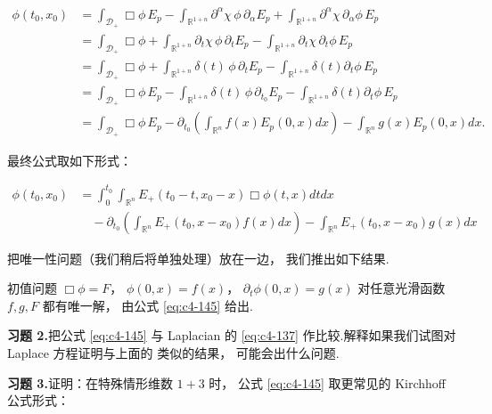 \[
\begin{aligned}
\phi(t_{0}, x_{0}) &= \int_{\mathcal{D}_{+}}\Box\phi\, E_{p} - \int_{\mathbb{R}^{1+n}}\partial^{\alpha}\chi\, \phi\, \partial_{\alpha}E_{p} + \int_{\mathbb{R}^{1+n}}\partial^{\alpha}\chi\, \partial_{\alpha}\phi\, E_{p} \\
&= \int_{\mathcal{D}_{+}}\Box\phi + \int_{\mathbb{R}^{1+n}}\partial_{t}\chi\, \phi\, \partial_{t}E_{p} - \int_{\mathbb{R}^{1+n}}\partial_{t}\chi\, \partial_{t}\phi\, E_{p} \\
&= \int_{\mathcal{D}_{+}}\Box\phi + \int_{\mathbb{R}^{1+n}}\delta(t)\, \phi\, \partial_{t}E_{p} - \int_{\mathbb{R}^{1+n}}\delta(t)\partial_{t}\phi\, E_{p} \\
&= \int_{\mathcal{D}_{+}}\Box\phi\, E_{p} - \int_{\mathbb{R}^{1+n}}\delta(t)\, \phi\, \partial_{t_{0}}E_{p} - \int_{\mathbb{R}^{1+n}}\delta(t)\partial_{t}\phi\, E_{p} \\
&= \int_{\mathcal{D}_{+}}\Box\phi\, E_{p} - \partial_{t_{0}}\left(\int_{\mathbb{R}^{n}}f(x)E_{p}(0, x)dx\right) - \int_{\mathbb{R}^{n}}g(x)E_{p}(0, x)dx.
\end{aligned}
\]

最终公式取如下形式：

\begin{equation}
\begin{aligned}
\phi(t_{0}, x_{0}) &= \int_{0}^{t_{0}}\int_{\mathbb{R}^{n}}E_{+}(t_{0}-t, x_{0}-x)\Box\phi(t, x)dtdx \\
&\quad - \partial_{t_{0}}\left(\int_{\mathbb{R}^{n}}E_{+}(t_{0}, x-x_{0})f(x)dx\right) - \int_{\mathbb{R}^{n}}E_{+}(t_{0}, x-x_{0})g(x)dx
\end{aligned}\label{eq:c4-145}
\end{equation}

把唯一性问题（我们稍后将单独处理）放在一边， 我们推出如下结果.

\begin{theorem}\label{thm:c4-3.2}
初值问题 $\Box\phi = F$， $\phi(0, x) = f(x)$， $\partial_{t}\phi(0, x) = g(x)$ 对任意光滑函数 $f, g, F$ 都有唯一解， 由公式 \eqref{eq:c4-145} 给出.
\end{theorem}

\noindent\textbf{习题 2.}\quad 把公式 \eqref{eq:c4-145} 与 Laplacian 的 \eqref{eq:c4-137} 作比较.解释如果我们试图对 Laplace 方程证明与上面的 类似的结果， 可能会出什么问题.

\noindent\textbf{习题 3.}\quad 证明：在特殊情形维数 $1+3$ 时， 公式 \eqref{eq:c4-145} 取更常见的 Kirchhoff 公式形式：

